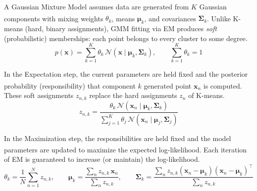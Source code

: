 \begin{tcbitemize}[ skin=sectionraster ]
    \tcbitem[title=Gaussian Mixture Models (GMM), raster multicolumn=3]
    A Gaussian Mixture Model assumes data are generated from $K$ Gaussian components with mixing weights $\theta_k$, means $\boldsymbol{\mu}_k$, and covariances $\boldsymbol{\Sigma}_k$\textsuperscript{\cite[][p.175]{iiiCourseMachineLearning}}. Unlike K-means (hard, binary assignments), GMM fitting via EM produces \emph{soft} (probabilistic) memberships: each point belongs to every cluster to some degree.
    \tcblower
    \begin{equation}
        p(\mathbf{x}) = \sum_{k=1}^{K} \theta_k \,\mathcal{N}(\mathbf{x} \mid \boldsymbol{\mu}_k, \boldsymbol{\Sigma}_k), \qquad \sum_{k=1}^{K}\theta_k = 1
    \end{equation}

    \tcbitem[title={E-Step: Computing Responsibilities}, raster multicolumn=3]
    In the Expectation step, the current parameters are held fixed and the posterior probability (responsibility) that component $k$ generated point $\mathbf{x}_n$ is computed\textsuperscript{\cite[][pp.~175--177]{iiiCourseMachineLearning}}. These soft assignments $z_{n,k}$ replace the hard assignments $z_n$ of K-means.
    \tcblower
    \begin{equation}
        z_{n,k} = \frac{\theta_k \,\mathcal{N}(\mathbf{x}_n \mid \boldsymbol{\mu}_k, \boldsymbol{\Sigma}_k)}
                       {\displaystyle\sum_{j=1}^{K} \theta_j \,\mathcal{N}(\mathbf{x}_n \mid \boldsymbol{\mu}_j, \boldsymbol{\Sigma}_j)}
    \end{equation}

    \tcbitem[title={M-Step: Re-estimating Parameters}, raster multicolumn=6]
    In the Maximization step, the responsibilities are held fixed and the model parameters are updated to maximize the expected log-likelihood\textsuperscript{\cite[][pp.~177--178]{iiiCourseMachineLearning}}. Each iteration of EM is guaranteed to increase (or maintain) the log-likelihood.
    \tcblower
    \begin{equation}
        \theta_k = \frac{1}{N}\sum_{n=1}^{N} z_{n,k}, \qquad
        \boldsymbol{\mu}_k = \frac{\sum_n z_{n,k}\,\mathbf{x}_n}{\sum_n z_{n,k}}, \qquad
        \boldsymbol{\Sigma}_k = \frac{\sum_n z_{n,k}(\mathbf{x}_n - \boldsymbol{\mu}_k)(\mathbf{x}_n - \boldsymbol{\mu}_k)^\top}{\sum_n z_{n,k}}
    \end{equation}


\end{tcbitemize}
